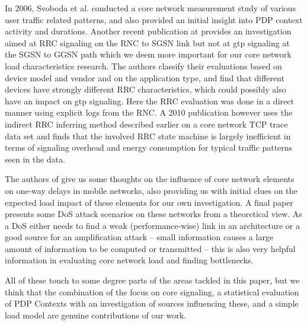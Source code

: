 In 2006, Svoboda et al. \cite{svoboda2006composition} conducted a core network measurement study of various user traffic related patterns, and also provided an initial insight into \gls{PDP} context activity and durations. Another recent publication at \cite{he2012panoramic} provides an investigation aimed at \gls{RRC} signaling on the \gls{RNC} to \gls{SGSN} link but not at \gls{gtp} signaling at the \gls{SGSN} to \gls{GGSN} path which we deem more important for our core network load characteristics research. The authors classify their evaluations based on device model and vendor and on the application type, and find that different devices have strongly different \gls{RRC} characteristics, which could possibly also have an impact on \gls{gtp} signaling. Here the \gls{RRC} evaluation was done in a direct manner using explicit logs from the \gls{RNC}. A 2010 publication\cite{Qian:2010:CRR:1879141.1879159} however uses the indirect \gls{RRC} inferring method described earlier on a core network TCP trace data set and finds that the involved \gls{RRC} state machine is largely inefficient in terms of signaling overhead and energy consumption for typical traffic patterns seen in the data.

The authors of \cite{4675847} give us some thoughts on the influence of core network elements on one-way delays in mobile networks, also providing us with initial clues on the expected load impact of these elements for our own investigation. A final paper \cite{Ricciato2010551} presents some \gls{DoS} attack scenarios on these networks from a theoretical view. As a \gls{DoS} either needs to find a weak (performance-wise) link in an architecture or a good source for an amplification attack -- small information causes a large amount of information to be computed or transmitted -- this is also very helpful information in evaluating core network load and finding bottlenecks.

All of these touch to some degree parts of the areas tackled in this paper, but we think that the combination of the focus on core signaling, a statistical evaluation of PDP Contexts with an investigation of sources influencing these, and a simple load model are genuine contributions of our work.


